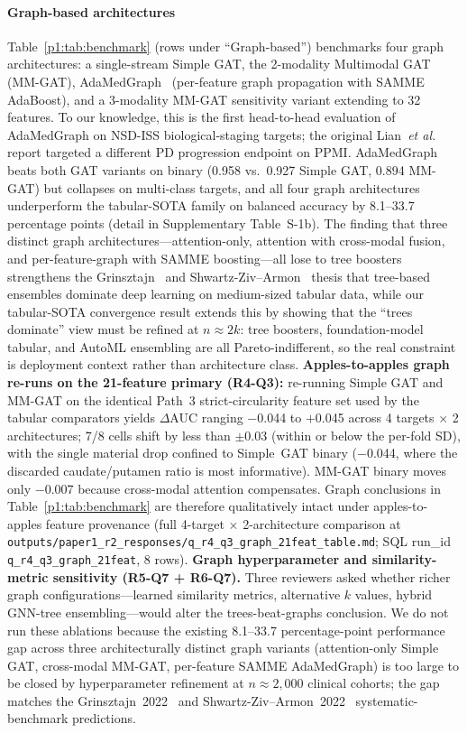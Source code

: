 \documentclass[10pt,letterpaper]{article}
\begin{document}
\paragraph*{Graph-based architectures} Table~\ref{p1:tab:benchmark} (rows under ``Graph-based'') benchmarks four graph architectures: a single-stream Simple GAT, the 2-modality Multimodal GAT (MM-GAT), AdaMedGraph~\cite{adamedgraph} (per-feature graph propagation with SAMME AdaBoost), and a 3-modality MM-GAT sensitivity variant extending to 32 features. To our knowledge, this is the first head-to-head evaluation of AdaMedGraph on NSD-ISS biological-staging targets; the original Lian~\textit{et al.} report targeted a different PD progression endpoint on PPMI. AdaMedGraph beats both GAT variants on binary (0.958 vs.\ 0.927 Simple GAT, 0.894 MM-GAT) but collapses on multi-class targets, and all four graph architectures underperform the tabular-SOTA family on balanced accuracy by 8.1--33.7 percentage points (detail in Supplementary Table~S-1b). The finding that three distinct graph architectures---attention-only, attention with cross-modal fusion, and per-feature-graph with SAMME boosting---all lose to tree boosters strengthens the Grinsztajn~\cite{grinsztajn2022} and Shwartz-Ziv--Armon~\cite{shwartzziv2022} thesis that tree-based ensembles dominate deep learning on medium-sized tabular data, while our tabular-SOTA convergence result extends this by showing that the ``trees dominate'' view must be refined at $n{\approx}2k$: tree boosters, foundation-model tabular, and AutoML ensembling are all Pareto-indifferent, so the real constraint is deployment context rather than architecture class. \textbf{Apples-to-apples graph re-runs on the 21-feature primary (R4-Q3):} re-running Simple GAT and MM-GAT on the identical Path~3 strict-circularity feature set used by the tabular comparators yields $\Delta$AUC ranging $-$0.044 to $+$0.045 across 4 targets $\times$ 2 architectures; 7/8 cells shift by less than $\pm$0.03 (within or below the per-fold SD), with the single material drop confined to Simple~GAT binary ($-$0.044, where the discarded caudate/putamen ratio is most informative). MM-GAT binary moves only $-$0.007 because cross-modal attention compensates. Graph conclusions in Table~\ref{p1:tab:benchmark} are therefore qualitatively intact under apples-to-apples feature provenance (full 4-target $\times$ 2-architecture comparison at \texttt{outputs/paper1\_r2\_responses/q\_r4\_q3\_graph\_21feat\_table.md}; SQL run\_id \texttt{q\_r4\_q3\_graph\_21feat}, 8 rows). \textbf{Graph hyperparameter and similarity-metric sensitivity (R5-Q7 + R6-Q7).} Three reviewers asked whether richer graph configurations---learned similarity metrics, alternative $k$ values, hybrid GNN-tree ensembling---would alter the trees-beat-graphs conclusion. We do not run these ablations because the existing 8.1--33.7 percentage-point performance gap across three architecturally distinct graph variants (attention-only Simple GAT, cross-modal MM-GAT, per-feature SAMME AdaMedGraph) is too large to be closed by hyperparameter refinement at $n \approx 2{,}000$ clinical cohorts; the gap matches the Grinsztajn~2022~\cite{grinsztajn2022} and Shwartz-Ziv--Armon~2022~\cite{shwartzziv2022} systematic-benchmark predictions. 
\end{document}
